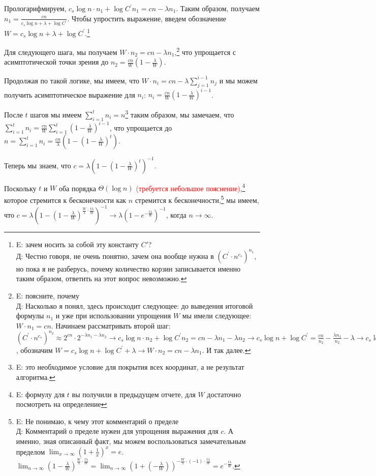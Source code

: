 \documentclass[a4paper,11pt]{article}
\begin{document}
Прологарифмируем, $c_s \log{n} \cdot n_1 + \log{C^{'}} n_1 = cn - \lambda n_1$. Таким образом, получаем $n_1 = \frac{cn}{c_s \log{n} + \lambda + \log{C^{'}}}$. Чтобы упростить выражение, введем обозначение $W=c_s \log{n} + \lambda + \log{C^{'}}$.\footnote{E: зачем носить за собой эту константу $C'$? \\ Д: Честно говоря, не очень понятно, зачем она вообще нужна в $(C^{'} \cdot n^{c_s})^{n_1}$, но пока я не разберусь, почему количество корзин записывается именно таким образом, ответить на этот вопрос невозможно.}

Для следующего шага, мы получаем $W \cdot n_2 = cn - \lambda n_1$,\footnote{E: поясните, почему \\ Д: Насколько я понял, здесь происходит следующее: до выведения итоговой формулы $n_1$ и уже при использовании упрощения $W$ мы имели следующее: $W \cdot n_1 = cn$. Начинаем рассматривать второй шаг: $(C^{'} \cdot n^{c_s})^{n_2} \approx 2^{cn} \cdot 2^{-\lambda n_1 - \lambda n_2} \rightarrow c_s \log{n} \cdot n_2 + \log{C^{'}} n_2 = cn - \lambda n_1 - \lambda n_2 \rightarrow c_s \log{n} + \log{C^{'}} = \frac{cn}{n_2} - \frac{\lambda n_1}{n_2} - \lambda \rightarrow c_s \log{n} + \log{C^{'}} + \lambda = \frac{cn - \lambda n_1}{n_2}$, обозначим $W = c_s \log{n} + \log{C^{'}} + \lambda \rightarrow W \cdot n_2 = cn - \lambda n_1$. И так далее.} что упрощается с асимптотической точки зрения до $n_2 = \frac{cn}{W} (1 - \frac{\lambda}{W})$.

Продолжая по такой логике, мы имеем, что $W \cdot n_i = cn - \lambda \sum_{j=1}^{i-1}  n_j$ и мы можем получить асимптотическое выражение для $n_i$: $n_i = \frac{cn}{W} (1 - \frac{\lambda}{W})^{i-1}$.

После $t$ шагов мы имеем $\sum_{i=1}^t n_i = n$\footnote{E: это необходимое условие для покрытия всех координат, а не результат алгоритма.} таким образом, мы замечаем, что $\sum_{i=1}^t n_i = \frac{cn}{W} \sum_{i=1}^t (1 - \frac{\lambda}{W})^{i-1}$, что упрощается до $n = \sum_{i=1}^t n_i = \frac{cn}{\lambda} (1-(1-\frac{\lambda}{W})^t)$.

Теперь мы знаем, что $c=\lambda (1-(1-\frac{\lambda}{W})^t)^{-1}$.

Поскольку $t$ и $W$ оба порядка $\Theta(\log{n})$  \textcolor{red}{(требуется небольшое пояснение)},\footnote{E: формулу для $t$ вы получили в предыдущем отчете, для $W$ достаточно посмотреть на определение } которое стремится к бесконечности как $n$ стремится к бесконечности,\footnote{E: Не понимаю, к чему этот комментарий о пределе \\ Д: Комментарий о пределе нужен для упрощения выражения для $c$. А именно, зная описанный факт, мы можем воспользоваться замечательным пределом $\lim_{x\to \infty} (1 + \frac{1}{x})^x = e$. $\lim_{n\to \infty} (1 - \frac{\lambda}{W})^{\frac{W}{\lambda} \cdot \frac{t\lambda}{W}} = \lim_{n\to \infty}  (1 + (- \frac{\lambda}{W}))^{- \frac{W}{\lambda} \cdot (-1) \cdot \frac{t\lambda}{W}} = e^{-\frac{t\lambda}{W}}$.} мы имеем, что $c=\lambda (1-(1-\frac{\lambda}{W})^{\frac{W}{\lambda} \cdot \frac{t \lambda}{W}})^{-1} \rightarrow \lambda (1-e^{- \frac{t \lambda}{W}})^{-1}$, когда $n \rightarrow \infty$.
\end{document}
